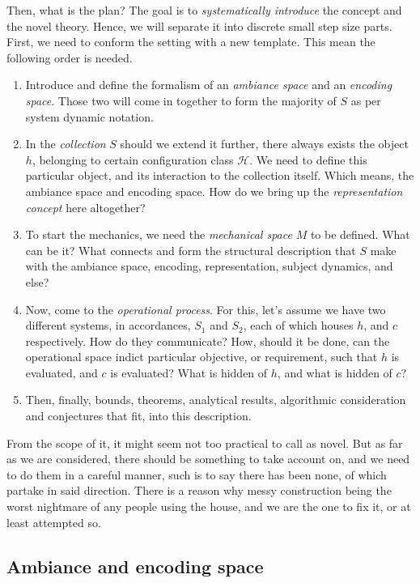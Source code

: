 \documentclass[10pt]{article}
\begin{document}
Then, what is the plan? The goal is to \textit{systematically introduce} the concept and the novel theory. Hence, we will separate it into discrete small step size parts. First, we need to conform the setting with a new template. This mean the following order is needed. 
\begin{enumerate}[leftmargin=1cm,itemsep=2pt,topsep=2pt]
  \item Introduce and define the formalism of an \textit{ambiance space} and an \textit{encoding space}. Those two will come in together to form the majority of $S$ as per system dynamic notation. 
  \item In the \textit{collection} $S$ should we extend it further, there always exists the object $h$, belonging to certain configuration class $\mathcal{H}$. We need to define this particular object, and its interaction to the collection itself. Which means, the ambiance space and encoding space. How do we bring up the \textit{representation concept} here altogether? 
  \item To start the mechanics, we need the \textit{mechanical space} $M$ to be defined. What can be it? What connects and form the structural description that $S$ make with the ambiance space, encoding, representation, subject dynamics, and else? 
  \item Now, come to the \textit{operational process}. For this, let's assume we have two different systems, in accordances, $S_{1}$ and $S_{2}$, each of which houses $h$, and $c$ respectively. How do they communicate? How, should it be done, can the operational space indict particular objective, or requirement, such that $h$ is evaluated, and $c$ is evaluated? What is hidden of $h$, and what is hidden of $c$? 
  \item Then, finally, bounds, theorems, analytical results, algorithmic consideration and conjectures that fit, into this description. 
\end{enumerate}
From the scope of it, it might seem not too practical to call as novel. But as far as we are considered, there should be something to take account on, and we need to do them in a careful manner, such is to say there has been none, of which partake in said direction. There is a reason why messy construction being the worst nightmare of any people using the house, and we are the one to fix it, or at least attempted so. 

\subsection{Ambiance and encoding space}
\end{document}
